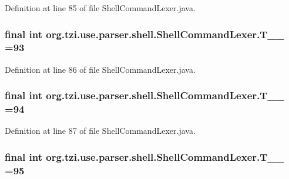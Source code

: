 Definition at line 85 of file Shell\-Command\-Lexer.\-java.

\hypertarget{classorg_1_1tzi_1_1use_1_1parser_1_1shell_1_1_shell_command_lexer_a78593c437cee99226161a0295665b60a}{
\subsubsection[{T\-\_\-\-\_\-93}]{\setlength{\rightskip}{0pt plus 5cm}final int org.\-tzi.\-use.\-parser.\-shell.\-Shell\-Command\-Lexer.\-T\-\_\-\-\_ =93\hspace{0.3cm}{\ttfamily [static]}}}\label{classorg_1_1tzi_1_1use_1_1parser_1_1shell_1_1_shell_command_lexer_a78593c437cee99226161a0295665b60a}


Definition at line 86 of file Shell\-Command\-Lexer.\-java.

\hypertarget{classorg_1_1tzi_1_1use_1_1parser_1_1shell_1_1_shell_command_lexer_af4a3be670602147cbffd0dae127bb153}{
\subsubsection[{T\-\_\-\-\_\-94}]{\setlength{\rightskip}{0pt plus 5cm}final int org.\-tzi.\-use.\-parser.\-shell.\-Shell\-Command\-Lexer.\-T\-\_\-\-\_ =94\hspace{0.3cm}{\ttfamily [static]}}}\label{classorg_1_1tzi_1_1use_1_1parser_1_1shell_1_1_shell_command_lexer_af4a3be670602147cbffd0dae127bb153}


Definition at line 87 of file Shell\-Command\-Lexer.\-java.

\hypertarget{classorg_1_1tzi_1_1use_1_1parser_1_1shell_1_1_shell_command_lexer_a3f7f162f9f5e1ef16801d3649c4068b2}{
\subsubsection[{T\-\_\-\-\_\-95}]{\setlength{\rightskip}{0pt plus 5cm}final int org.\-tzi.\-use.\-parser.\-shell.\-Shell\-Command\-Lexer.\-T\-\_\-\-\_ =95\hspace{0.3cm}{\ttfamily [static]}}}\label{classorg_1_1tzi_1_1use_1_1parser_1_1shell_1_1_shell_command_lexer_a3f7f162f9f5e1ef16801d3649c4068b2}



